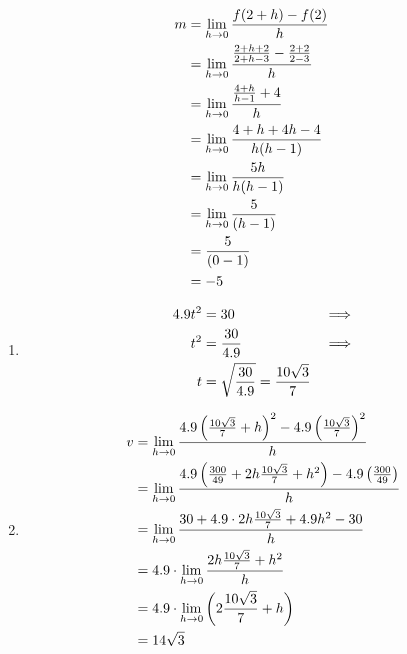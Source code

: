 \documentclass{../../../classes/anal}
\begin{document}
    \begin{equation*}
        \begin{aligned}
            m 
            &= \lim_{h\to0} {f(2 + h) - f(2) \over h} \\
            &= \lim_{h\to0} {{2 + h + 2 \over 2 + h - 3} - {2 + 2 \over 2 - 3} \over h} \\
            &= \lim_{h\to0} {{4 + h \over h - 1} + 4 \over h} \\
            &= \lim_{h\to0} {4 + h + 4h - 4 \over h(h - 1)} \\
            &= \lim_{h\to0} {5h \over h(h - 1)} \\
            &= \lim_{h\to0} {5 \over (h - 1)} \\
            &= {5 \over (0 - 1)} \\
            &= -5 \\
        \end{aligned}
    \end{equation*}


    \begin{enumerate}[label={(\alph*)}]
        \item \begin{equation*}
            \begin{aligned}    
                4.9t^2 &= 30 & \implies \\
                t^2 &= {30 \over 4.9} & \implies \\
                t &= \sqrt{30 \over 4.9} = {10\sqrt{3} \over 7}
            \end{aligned}
        \end{equation*}
        \item \begin{equation*}
            \begin{aligned}
                v
                &= \lim_{h\to0} {4.9\left({10\sqrt{3} \over 7} + h\right)^2 - 4.9\left({10\sqrt{3} \over 7}\right)^2 \over h} \\
                &= \lim_{h\to0} {4.9\left({300 \over 49} + 2h{10\sqrt{3} \over 7} + h^2\right) - 4.9\left({300 \over 49}\right) \over h} \\
                &= \lim_{h\to0} {30 + 4.9 \cdot 2h{10\sqrt{3} \over 7} + 4.9 h^2 - 30 \over h} \\
                &= 4.9 \cdot \lim_{h\to0} {2h{10\sqrt{3} \over 7} + h^2 \over h} \\
                &= 4.9 \cdot \lim_{h\to0} \left(2{10\sqrt{3} \over 7} + h\right) \\
                &= 14\sqrt{3} \\
            \end{aligned}
        \end{equation*}
    \end{enumerate}
\end{document}
